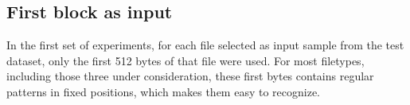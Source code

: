 % 










\subsection{First block as input}
In the first set of experiments, for each file selected as input sample from the test dataset, only the first 512 bytes of that file were used. For most filetypes, including those three under consideration, these first bytes contains regular patterns in fixed positions, which makes them easy to recognize.

